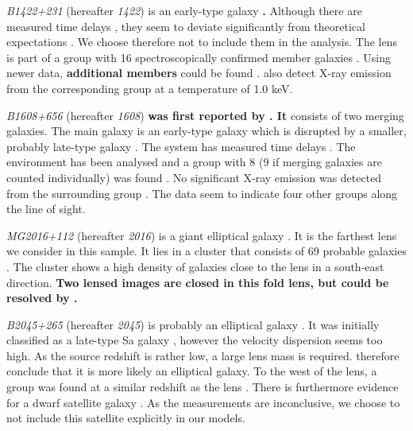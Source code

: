 \documentclass[useAMS,usenatbib]{mn2e}
\newcommand{\cb}[1]{{\color{red} \textbf{#1}}}
\begin{document}
\textit{B1422+231} (hereafter \textit{1422}) is an early-type galaxy \cb{\citep{1992MNRAS.259P...1P,1994AJ....107...28Y}.} Although there are measured time delays \citep{2001MNRAS.326.1403P}, they seem to deviate significantly from theoretical expectations \citep{2003AJ....126...29R}. We choose therefore not to include them in the analysis. The lens is part of a group with 16 spectroscopically confirmed member galaxies \citep{2006ApJ...641..169M}. Using newer data, \cb{additional members} could be found \citep{2011ApJ...726...84W}. \cite{2004ApJ...610..686G} also detect X-ray emission from the corresponding group at a temperature of 1.0 keV.

\textit{B1608+656} (hereafter \textit{1608}) \cb{was first reported by \cite{1995ApJ...447L...5M}. It} consists of two merging galaxies. The main galaxy is an early-type galaxy which is disrupted by a smaller, probably late-type galaxy \citep{2003ApJ...584..100S}. The system has measured time delays \citep{2002ApJ...581..823F}. The environment has been analysed and a group with 8 (9 if merging galaxies are counted individually) was found \citep{2006ApJ...642...30F}. No significant X-ray emission was detected from the surrounding group \citep{2005ApJ...625..633D}. The data seem to indicate four other groups along the line of sight.

\textit{MG2016+112} (hereafter \textit{2016}) is a giant elliptical galaxy \citep{1984Sci...223...46L,1986AJ.....91..991S}. It is the farthest lens we consider in this sample. It lies in a cluster that consists of 69 probable galaxies \citep{2003MNRAS.344..337T}. The cluster shows a high density of galaxies close to the lens in a south-east direction. \cb{Two lensed images are closed in this fold lens, but could be resolved by \cite{2009MNRAS.394..174M}.}

\textit{B2045+265} (hereafter \textit{2045}) is probably an elliptical galaxy \citep{2007MNRAS.378..109M}. It was initially classified as a late-type Sa galaxy \citep{1999AJ....117..658F}, however the velocity dispersion seems too high. As the source redshift is rather low, a large lens mass is required. \cite{2007MNRAS.378..109M} therefore conclude that it is more likely an elliptical galaxy. To the west of the lens, a group was found at a similar redshift as the lens \citep{1999AJ....117..658F}. There is furthermore evidence for a dwarf satellite galaxy \citep{2007MNRAS.378..109M}. As the measurements are inconclusive, we choose to not include this satellite explicitly in our models.
\end{document}
